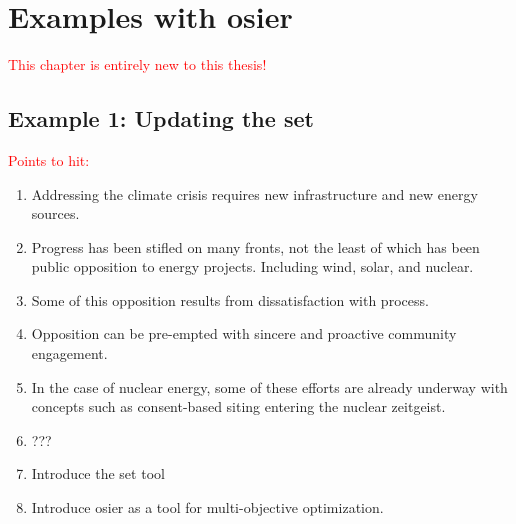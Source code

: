






\chapter{Examples with \acs{osier}}
\label{chapter:examples}

\textcolor{red}{This chapter is entirely new to this thesis!}

\section{Example 1: Updating the \ac{set}}

\textcolor{red}{Points to hit:}
\begin{enumerate}
    \item Addressing the climate crisis requires new infrastructure and new energy sources.
    \item Progress has been stifled on many fronts, not the least of which has been public opposition to energy projects. Including wind, solar, and nuclear.
    \item Some of this opposition results from dissatisfaction with process.
    \item Opposition can be pre-empted with sincere and proactive community engagement.
    \item In the case of nuclear energy, some of these efforts are already underway with concepts such as consent-based siting entering the nuclear zeitgeist.
    \item ???
    \item Introduce the \ac{set} tool
    \item  Introduce \ac{osier} as a tool for multi-objective optimization.
\end{enumerate}

